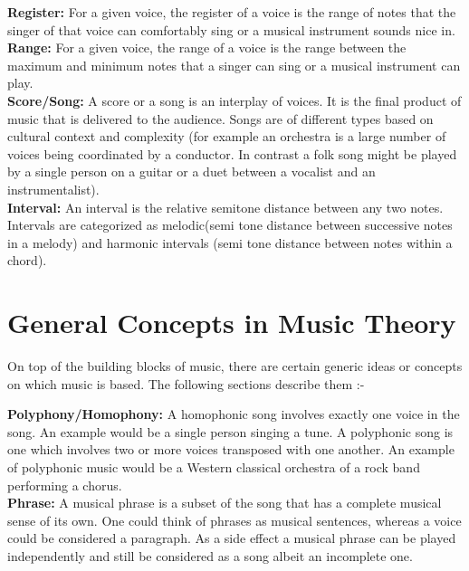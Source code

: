 \noindent \textbf{Register:} For a given voice, the register of a voice is the range of notes that the singer of that voice can comfortably sing or a musical instrument sounds nice in. \\

\noindent \textbf{Range:} For a given voice, the range of a voice is the range between the maximum and minimum notes that a singer can sing or a musical instrument can play.  \\

\noindent \textbf{Score/Song:} A score or a song is an interplay of voices. It is the final product of music that is delivered to the audience. Songs are of different types based on cultural context and complexity (for example an orchestra is a large number of voices being coordinated by a conductor. In contrast a folk song might be played by a single person on a guitar or a duet between a vocalist and an instrumentalist). \\

\noindent \textbf{Interval:} An interval is the relative semitone distance between any two notes. Intervals are categorized as melodic(semi tone distance between successive notes in a melody) and harmonic intervals (semi tone distance between notes within a chord).

\section{General Concepts in Music Theory}

\noindent On top of the building blocks of music, there are certain generic ideas or concepts on which music is based. The following sections describe them :-

\noindent \textbf{Polyphony/Homophony:} A homophonic song involves exactly one voice in the song. An example would be a single person singing a tune. A polyphonic song is one which involves two or more voices transposed with one another. An example of polyphonic music would be a Western classical orchestra of a rock band performing a chorus. \\

\noindent \textbf{Phrase:} A musical phrase is a subset of the song that has a complete musical sense of its own. One could think of phrases as musical sentences, whereas a voice could be considered a paragraph. As a side effect a musical phrase can be played independently and still be considered as a song albeit an incomplete one. \\

